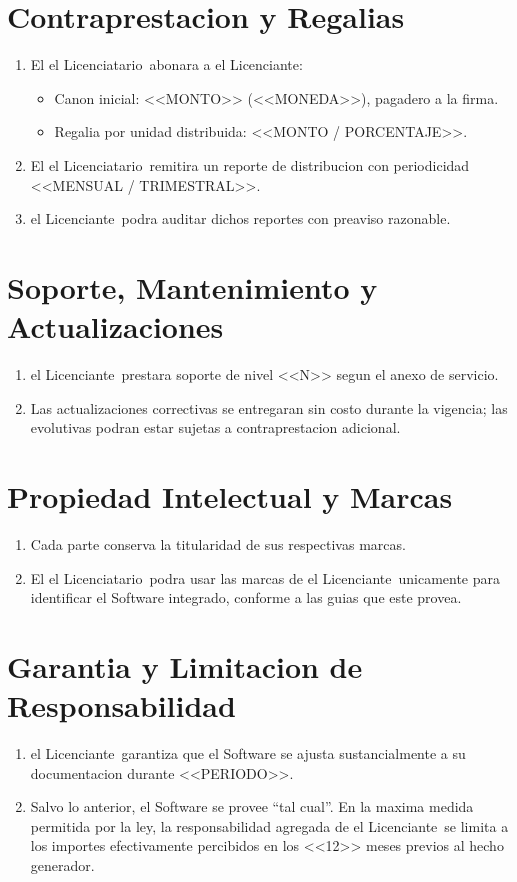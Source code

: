 \documentclass[11pt,a4paper]{article}
\newcommand{\LicencianteAbrev}{el Licenciante}
\newcommand{\LicenciatarioAbrev}{el Licenciatario}
\begin{document}
\section{Contraprestacion y Regalias}
\begin{enumerate}
  \item El \LicenciatarioAbrev\ abonara a \LicencianteAbrev:
        \begin{itemize}
          \item Canon inicial: <<MONTO>> (<<MONEDA>>), pagadero a la firma.
          \item Regalia por unidad distribuida: <<MONTO / PORCENTAJE>>.
        \end{itemize}
  \item El \LicenciatarioAbrev\ remitira un reporte de distribucion con periodicidad
        <<MENSUAL / TRIMESTRAL>>.
  \item \LicencianteAbrev\ podra auditar dichos reportes con preaviso razonable.
\end{enumerate}

\section{Soporte, Mantenimiento y Actualizaciones}
\begin{enumerate}
  \item \LicencianteAbrev\ prestara soporte de nivel <<N>> segun el anexo de servicio.
  \item Las actualizaciones correctivas se entregaran sin costo durante la vigencia; las
        evolutivas podran estar sujetas a contraprestacion adicional.
\end{enumerate}

\section{Propiedad Intelectual y Marcas}
\begin{enumerate}
  \item Cada parte conserva la titularidad de sus respectivas marcas.
  \item El \LicenciatarioAbrev\ podra usar las marcas de \LicencianteAbrev\ unicamente para
        identificar el Software integrado, conforme a las guias que este provea.
\end{enumerate}

\section{Garantia y Limitacion de Responsabilidad}
\begin{enumerate}
  \item \LicencianteAbrev\ garantiza que el Software se ajusta sustancialmente a su
        documentacion durante <<PERIODO>>.
  \item Salvo lo anterior, el Software se provee \enquote{tal cual}. En la maxima medida
        permitida por la ley, la responsabilidad agregada de \LicencianteAbrev\ se limita a
        los importes efectivamente percibidos en los <<12>> meses previos al hecho generador.
\end{enumerate}
\end{document}
